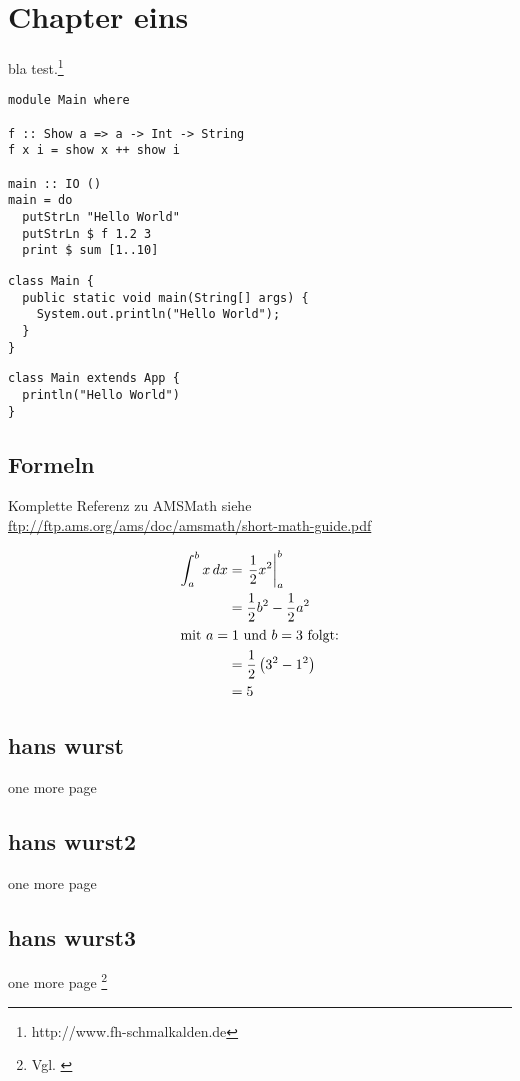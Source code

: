 \chapter{Chapter eins}
bla test.\footnote{http://www.fh-schmalkalden.de}

\begin{lstlisting}[label=listinghaskell,caption=This is Haskell]
module Main where

f :: Show a => a -> Int -> String
f x i = show x ++ show i

main :: IO ()
main = do
  putStrLn "Hello World"
  putStrLn $ f 1.2 3
  print $ sum [1..10]
\end{lstlisting}

\begin{lstlisting}[label=listingjava,caption=This is \gls{glo:Java}]
class Main {
  public static void main(String[] args) {
    System.out.println("Hello World");
  }
}
\end{lstlisting}

\begin{lstlisting}[label=listingscala,caption=This is Scala]
class Main extends App {
  println("Hello World")
}
\end{lstlisting}

\section{Formeln}

Komplette Referenz zu AMSMath siehe \\
\url{ftp://ftp.ams.org/ams/doc/amsmath/short-math-guide.pdf}

\begin{align}
 \int_{a}^{b} x\,dx
 & = \left.\frac{1}{2} x^2\right\vert_{a}^{b}\\
 & = \frac{1}{2} b^2 - \frac{1}{2} a^2 \\
 \intertext{mit $a=1$ und $b=3$ folgt:}
 \notag
 & = \frac{1}{2} \left(3^2 - 1^2\right)\\
 & = 5
\end{align}

\section{hans wurst}
one more page

\section{hans wurst2}
one more page

\section{hans wurst3}
one more page \footnote{Vgl. \cite{braun:scala}}

